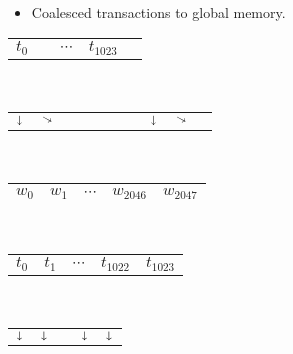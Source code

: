\begin{frame}
\begin{center}
{\begin{minipage}{0.45\textwidth}
\begin{tabular}{|C{0.59cm}|C{0.59cm}|C{0.59cm}|C{0.59cm}|C{0.59cm}|}
        \hline
      \end{tabular}\\
    \end{minipage}
  }
\end{center}
\pause
  \begin{itemize}
  \item Coalesced transactions to global memory.
  \end{itemize}\vspace*{-0.4em}
  \begin{center}
  {\tiny
    \begin{minipage}{0.45\textwidth}
      \centering
      \begin{tabular}{C{0.6cm}C{0.6cm}C{0.6cm}C{0.6cm}C{0.6cm}}
        $t_0$ & & $\cdots$ & $t_{1023}$ & \\
      \end{tabular}\\[-0.5ex]
      \begin{tabular}{C{0.02cm}C{0.02cm}C{0.02cm}C{0.02cm}C{0.02cm}C{0.02cm}C{0.02cm}C{0.02cm}C{0.02cm}C{0.02cm}}
        $\shortdownarrow$ & $\diagonalarrowdown$ &  &  &  &  &  & $\shortdownarrow$ & $\diagonalarrowdown$ & \\
      \end{tabular}\\[-0.5ex]
      \begin{tabular}{|C{0.59cm}|C{0.59cm}|C{0.59cm}|C{0.59cm}|C{0.59cm}|}
        \hline
        $w_0$ & $w_1$ & $\cdots$ & $w_{2046}$ & $w_{2047}$\\
        \hline
      \end{tabular}\\
    \end{minipage}\qquad
  \begin{minipage}{0.45\textwidth}
    \centering
      \begin{tabular}{C{0.6cm}C{0.6cm}C{0.6cm}C{0.6cm}C{0.6cm}}
        $t_0$ & $t_1$ & $\cdots$ & $t_{1022}$ & $t_{1023}$ \\
      \end{tabular}\\[-0.5ex]
      \begin{tabular}{C{0.6cm}C{0.6cm}C{0.6cm}C{0.6cm}C{0.6cm}}
        $\shortdownarrow$ & $\shortdownarrow$ & & $\shortdownarrow$ & $\shortdownarrow$ \\
      \end{tabular}\\[-0.5ex]
      \begin{tabular}{|C{0.59cm}|C{0.59cm}|C{0.59cm}|C{0.59cm}|C{0.59cm}|}

\end{tabular}
\end{minipage}}
\end{center}
\end{frame}

